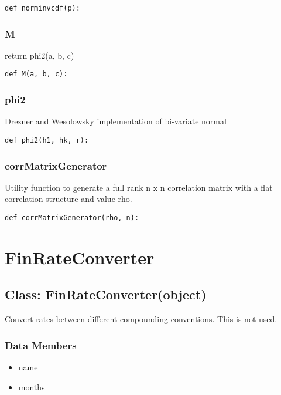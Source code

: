 \documentclass[twoside,11pt]{book}
\begin{document}
\begin{lstlisting}
def norminvcdf(p):
\end{lstlisting}

\subsubsection*{{\bf M}}
return phi2(a, b, c) 

\begin{lstlisting}
def M(a, b, c):
\end{lstlisting}

\subsubsection*{{\bf phi2}}
Drezner and Wesolowsky implementation of bi-variate normal  

\begin{lstlisting}
def phi2(h1, hk, r):
\end{lstlisting}

\subsubsection*{{\bf corrMatrixGenerator}}
Utility function to generate a full rank n x n correlation matrix with a flat correlation structure and value rho.  

\begin{lstlisting}
def corrMatrixGenerator(rho, n):
\end{lstlisting}

\newpage
\section{FinRateConverter}

\subsection*{Class: FinRateConverter(object)}
Convert rates between different compounding conventions. This is not used.  

\subsubsection*{Data Members}
\begin{itemize}
\item{name}
\item{months}
\end{itemize}
\end{document}
